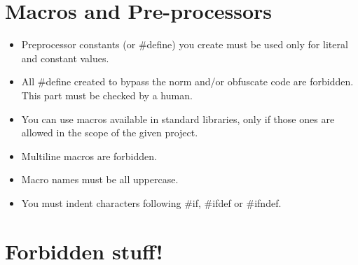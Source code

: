 \documentclass{42-ru}
\begin{document}
                
    \section{Macros and Pre-processors}

        \begin{itemize}

            \item Preprocessor constants (or \#define) you create must be used
                only for literal and constant values.
            \item All \#define created to bypass the norm and/or obfuscate
                code are forbidden. This part must be checked by a human.
            \item You can use macros available in standard libraries, only
                if those ones are allowed in the scope of the given project.
            \item Multiline macros are forbidden.
            \item Macro names must be all uppercase.
            \item You must indent characters following \#if, \#ifdef
                or \#ifndef.

        \end{itemize}
        \newpage


    \section{Forbidden stuff!}
\end{document}
